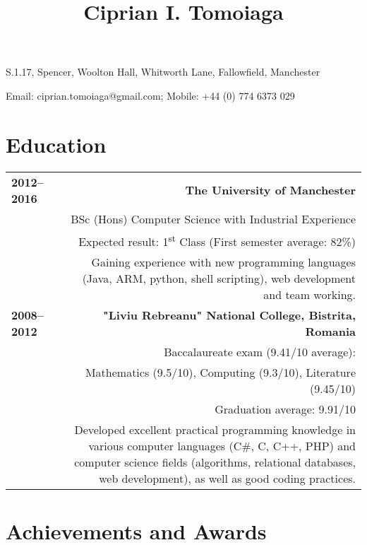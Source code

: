 \documentclass[11pt,a4paper]{article}
\title{\bfseries Ciprian I. Tomoiaga\vspace{-6ex}}
\date{\vspace{-5ex}}       %
\begin{document}
\maketitle
\thispagestyle{empty}

\begin{center}
S.1.17, Spencer, Woolton Hall, Whitworth Lane, Fallowfield, Manchester

Email: ciprian.tomoiaga@gmail.com; Mobile: +44 (0) 774 6373 029\vspace{-2ex}
\end{center}

\section*{Education\vspace{-2ex}}
\begin{tabular}{LR}
\bf 2012--2016&{\bf The University of Manchester}\\
&BSc (Hons) Computer Science with Industrial Experience\\
&Expected result: 1\textsuperscript{st} Class (First semester average: 82\%)\\
&Gaining experience with new programming languages (Java, ARM, python, shell scripting), web development and team working.\vspace{5pt}\\
\bf 2008--2012&\bf"Liviu Rebreanu" National College, Bistrita, Romania\\ 
&Baccalaureate exam (9.41/10 average):\\
&Mathematics (9.5/10), Computing (9.3/10), Literature (9.45/10)\vspace{5pt}\\
&Graduation average: 9.91/10\vspace{5pt}\\
&Developed excellent practical programming knowledge in various computer languages (C\#, C, C++, PHP) and computer science fields (algorithms, relational databases, web development), as well as good coding practices.\vspace{-2ex}\\

\end{tabular}

\section*{Achievements and Awards\vspace{-2ex}}
\end{document}
